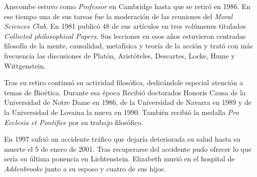 Anscombe estuvo como \emph{Professor} en Cambridge hasta que se retiró en 1986. En ese tiempo una de sus tareas fue la moderación de las reuniones del \emph{Moral Sciences Club}. En 1981 publicó 48 de sus artículos en tres volúmenes titulados \emph{Collected philosophical Papers}. Sus lecciones en esos años estuvieron centradas filosofía de la mente, causalidad, metafísica y teoría de la acción y trató con más frecuencia las discusiones de Platón, Aristóteles, Descartes, Locke, Hume y Wittgenstein.\autocite[Cf.~][46]{torralba2005accion}

Tras su retiro continuó su actividad filosófica, dedicándole especial atención a temas de Bioética. Durante esa época Recibió doctorados Honoris Causa de la Universidad de Notre Dame en 1986, de la Universidad de Navarra en 1989 y de la Universidad de Lovaina la nueva en 1990. También recibió la medalla \emph{Pro Ecclesia et Pontifice} por su trabajo filosófico.\autocite[Cf.~][48]{torralba2005accion}

En 1997 sufrió un accidente tráfico que dejaría deteriorada su salud hasta su muerte el 5 de enero de 2001. Tras recuperarse del accidente pudo ofrecer lo que sería su última ponencia en Lichtenstein. Elizabeth murió en el hospital de \emph{Addenbrooke} junto a su esposo y cuatro de sus hijos.\autocite[Cf.~][50]{teichman2002fellows}
